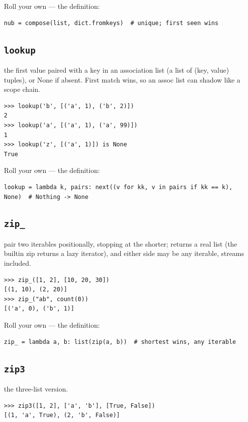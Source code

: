 \documentclass[10pt,letterpaper]{book}
\begin{document}
Roll your own --- the definition:

\begin{lstlisting}[style=ex]
nub = compose(list, dict.fromkeys)  # unique; first seen wins
\end{lstlisting}

\subsection{\texttt{lookup}}\label{def:lookup}
the first value paired with a key in an association list (a list of (key, value) tuples), or None if absent. First match wins, so an assoc list can shadow like a scope chain.
\begin{lstlisting}[style=ex]
>>> lookup('b', [('a', 1), ('b', 2)])
2
>>> lookup('a', [('a', 1), ('a', 99)])
1
>>> lookup('z', [('a', 1)]) is None
True
\end{lstlisting}

Roll your own --- the definition:

\begin{lstlisting}[style=ex]
lookup = lambda k, pairs: next((v for kk, v in pairs if kk == k), None)  # Nothing -> None
\end{lstlisting}
\subsection{\texttt{zip\_}}\label{def:zip-}
pair two iterables positionally, stopping at the shorter; returns a real list (the builtin zip returns a lazy iterator), and either side may be any iterable, streams included.
\begin{lstlisting}[style=ex]
>>> zip_([1, 2], [10, 20, 30])
[(1, 10), (2, 20)]
>>> zip_("ab", count(0))
[('a', 0), ('b', 1)]
\end{lstlisting}

Roll your own --- the definition:

\begin{lstlisting}[style=ex]
zip_ = lambda a, b: list(zip(a, b))  # shortest wins, any iterable
\end{lstlisting}

\subsection{\texttt{zip3}}\label{def:zip3}
the three-list version.
\begin{lstlisting}[style=ex]
>>> zip3([1, 2], ['a', 'b'], [True, False])
[(1, 'a', True), (2, 'b', False)]
\end{lstlisting}
\end{document}
